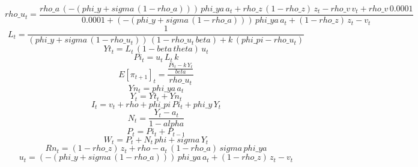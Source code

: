 \begin{dmath}
{rho\_u_{t}}=\frac{{rho\_a}\, \left(-\left({phi\_y}+{sigma}\, \left(1-{rho\_a}\right)\right)\right)\, {phi\_ya}\, {a_{t}}+{rho\_z}\, \left(1-{rho\_z}\right)\, {z_{t}}-{rho\_v}\, {v_{t}}+{rho\_v}\, 0.0001}{0.0001+\left(-\left({phi\_y}+{sigma}\, \left(1-{rho\_a}\right)\right)\right)\, {phi\_ya}\, {a_{t}}+\left(1-{rho\_z}\right)\, {z_{t}}-{v_{t}}}
\end{dmath}
\begin{dmath}
{L_{t}}=\frac{1}{\left({phi\_y}+{sigma}\, \left(1-{rho\_u_{t}}\right)\right)\, \left(1-{rho\_u_{t}}\, {beta}\right)+{k}\, \left({phi\_pi}-{rho\_u_{t}}\right)}
\end{dmath}
\begin{dmath}
{Yt_{t}}={L_{t}}\, \left(1-{beta}\, {theta}\right)\, {u_{t}}
\end{dmath}
\begin{dmath}
{Pi_{t}}={u_{t}}\, {L_{t}}\, {k}
\end{dmath}
\begin{dmath}
{{E[\pi_{t+1}]}_{t}}=\frac{\frac{{Pi_{t}}-{k}\, {Y_{t}}}{{beta}}}{{rho\_u_{t}}}
\end{dmath}
\begin{dmath}
{Yn_{t}}={phi\_ya}\, {a_{t}}
\end{dmath}
\begin{dmath}
{Y_{t}}={Yt_{t}}+{Yn_{t}}
\end{dmath}
\begin{dmath}
{I_{t}}={v_{t}}+{rho}+{phi\_pi}\, {Pi_{t}}+{phi\_y}\, {Y_{t}}
\end{dmath}
\begin{dmath}
{N_{t}}=\frac{{Y_{t}}-{a_{t}}}{1-{alpha}}
\end{dmath}
\begin{dmath}
{P_{t}}={Pi_{t}}+{P_{t-1}}
\end{dmath}
\begin{dmath}
{W_{t}}={P_{t}}+{N_{t}}\, {phi}+{sigma}\, {Y_{t}}
\end{dmath}
\begin{dmath}
{Rn_{t}}=\left(1-{rho\_z}\right)\, {z_{t}}+{rho}-{a_{t}}\, \left(1-{rho\_a}\right)\, {sigma}\, {phi\_ya}
\end{dmath}
\begin{dmath}
{u_{t}}=\left(-\left({phi\_y}+{sigma}\, \left(1-{rho\_a}\right)\right)\right)\, {phi\_ya}\, {a_{t}}+\left(1-{rho\_z}\right)\, {z_{t}}-{v_{t}}
\end{dmath}

